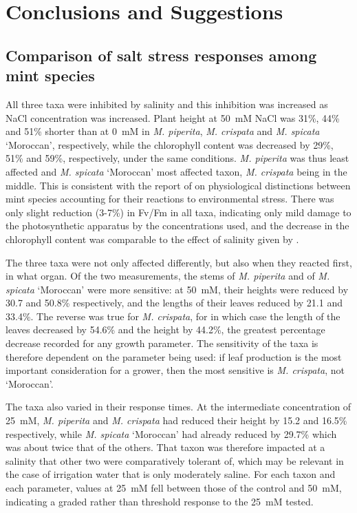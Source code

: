 \chapter{Conclusions and Suggestions}

\section{Comparison of salt stress responses among mint species}

All three taxa were inhibited by salinity and this inhibition was increased as NaCl concentration was increased. Plant height at 50~mM NaCl was 31\%, 44\% and 51\% shorter than at 0~mM in \textit{M. piperita}, \textit{M. crispata} and \textit{M. spicata} `Moroccan', respectively, while the chlorophyll content was decreased by 29\%, 51\% and 59\%, respectively, under the same conditions. \textit{M. piperita} was thus least affected and \textit{M. spicata} `Moroccan' most affected taxon, \textit{M. crispata} being in the middle. This is consistent with the report of \textcite{Singh2022} on physiological distinctions between mint species accounting for their reactions to environmental stress. There was only slight reduction (3-7\%) in Fv/Fm in all taxa, indicating only mild damage to the photosynthetic apparatus by the concentrations used, and the decrease in the chlorophyll content was comparable to the effect of salinity given by \textcite{Kalaji2021}.

The three taxa were not only affected differently, but also when they reacted first, in what organ. Of the two measurements, the stems of \textit{M. piperita} and of \textit{M. spicata} `Moroccan' were more sensitive: at 50~mM, their heights were reduced by 30.7 and 50.8\% respectively, and the lengths of their leaves reduced by 21.1 and 33.4\%. The reverse was true for \textit{M. crispata}, for in which case the length of the leaves decreased by 54.6\% and the height by 44.2\%, the greatest percentage decrease recorded for any growth parameter. The sensitivity of the taxa is therefore dependent on the parameter being used: if leaf production is the most important consideration for a grower, then the most sensitive is \textit{M. crispata}, not `Moroccan'.

The taxa also varied in their response times. At the intermediate concentration of 25~mM, \textit{M. piperita} and \textit{M. crispata} had reduced their height by 15.2 and 16.5\% respectively, while \textit{M. spicata} `Moroccan' had already reduced by 29.7\% which was about twice that of the others. That taxon was therefore impacted at a salinity that other two were comparatively tolerant of, which may be relevant in the case of irrigation water that is only moderately saline. For each taxon and each parameter, values at 25~mM fell between those of the control and 50~mM, indicating a graded rather than threshold response to the 25~mM tested.

